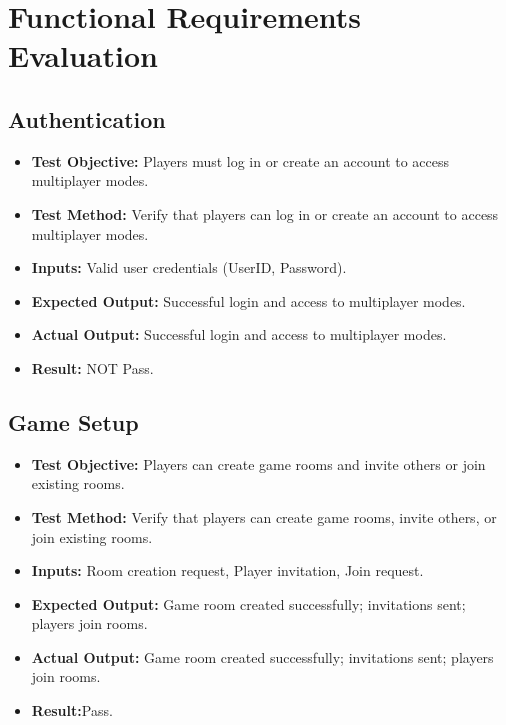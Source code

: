 \documentclass[12pt, titlepage]{article}
\begin{document}
\newpage

\tableofcontents

\listoftables %

\listoffigures %

\newpage


\section{Functional Requirements Evaluation}

\subsection{Authentication}
\begin{itemize}
    \item \textbf{Test Objective:} Players must log in or create an account to access multiplayer modes.
    \item \textbf{Test Method:} Verify that players can log in or create an account to access multiplayer modes.
    \item \textbf{Inputs:} Valid user credentials (UserID, Password).
    \item \textbf{Expected Output:} Successful login and access to multiplayer modes.
    \item \textbf{Actual Output:} Successful login and access to multiplayer modes.
    \item \textbf{Result:} NOT Pass.
\end{itemize}

\subsection{Game Setup}
\begin{itemize}
    \item \textbf{Test Objective:} Players can create game rooms and invite others or join existing rooms.
    \item \textbf{Test Method:} Verify that players can create game rooms, invite others, or join existing rooms.
    \item \textbf{Inputs:} Room creation request, Player invitation, Join request.
    \item \textbf{Expected Output:} Game room created successfully; invitations sent; players join rooms.
    \item \textbf{Actual Output:} Game room created successfully; invitations sent; players join rooms.
    \item \textbf{Result:}Pass.
\end{itemize}
\end{document}
